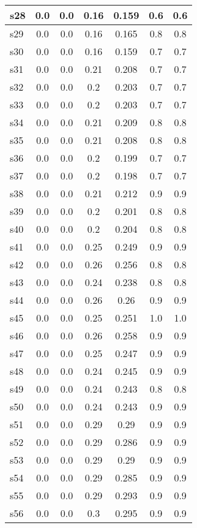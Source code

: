 \documentclass{article}
\begin{document}
\begin{tabular}{|l|c|c|c|c|c|c|}
\hline
s28 &0.0 & 0.0 & 0.16 & 0.159 & 0.6 & 0.6\\
\hline
s29 &0.0 & 0.0 & 0.16 & 0.165 & 0.8 & 0.8\\
\hline
s30 &0.0 & 0.0 & 0.16 & 0.159 & 0.7 & 0.7\\
\hline
s31 &0.0 & 0.0 & 0.21 & 0.208 & 0.7 & 0.7\\
\hline
s32 &0.0 & 0.0 & 0.2 & 0.203 & 0.7 & 0.7\\
\hline
s33 &0.0 & 0.0 & 0.2 & 0.203 & 0.7 & 0.7\\
\hline
s34 &0.0 & 0.0 & 0.21 & 0.209 & 0.8 & 0.8\\
\hline
s35 &0.0 & 0.0 & 0.21 & 0.208 & 0.8 & 0.8\\
\hline
s36 &0.0 & 0.0 & 0.2 & 0.199 & 0.7 & 0.7\\
\hline
s37 &0.0 & 0.0 & 0.2 & 0.198 & 0.7 & 0.7\\
\hline
s38 &0.0 & 0.0 & 0.21 & 0.212 & 0.9 & 0.9\\
\hline
s39 &0.0 & 0.0 & 0.2 & 0.201 & 0.8 & 0.8\\
\hline
s40 &0.0 & 0.0 & 0.2 & 0.204 & 0.8 & 0.8\\
\hline
s41 &0.0 & 0.0 & 0.25 & 0.249 & 0.9 & 0.9\\
\hline
s42 &0.0 & 0.0 & 0.26 & 0.256 & 0.8 & 0.8\\
\hline
s43 &0.0 & 0.0 & 0.24 & 0.238 & 0.8 & 0.8\\
\hline
s44 &0.0 & 0.0 & 0.26 & 0.26 & 0.9 & 0.9\\
\hline
s45 &0.0 & 0.0 & 0.25 & 0.251 & 1.0 & 1.0\\
\hline
s46 &0.0 & 0.0 & 0.26 & 0.258 & 0.9 & 0.9\\
\hline
s47 &0.0 & 0.0 & 0.25 & 0.247 & 0.9 & 0.9\\
\hline
s48 &0.0 & 0.0 & 0.24 & 0.245 & 0.9 & 0.9\\
\hline
s49 &0.0 & 0.0 & 0.24 & 0.243 & 0.8 & 0.8\\
\hline
s50 &0.0 & 0.0 & 0.24 & 0.243 & 0.9 & 0.9\\
\hline
s51 &0.0 & 0.0 & 0.29 & 0.29 & 0.9 & 0.9\\
\hline
s52 &0.0 & 0.0 & 0.29 & 0.286 & 0.9 & 0.9\\
\hline
s53 &0.0 & 0.0 & 0.29 & 0.29 & 0.9 & 0.9\\
\hline
s54 &0.0 & 0.0 & 0.29 & 0.285 & 0.9 & 0.9\\
\hline
s55 &0.0 & 0.0 & 0.29 & 0.293 & 0.9 & 0.9\\
\hline
s56 &0.0 & 0.0 & 0.3 & 0.295 & 0.9 & 0.9\\

\end{tabular}
\end{document}
